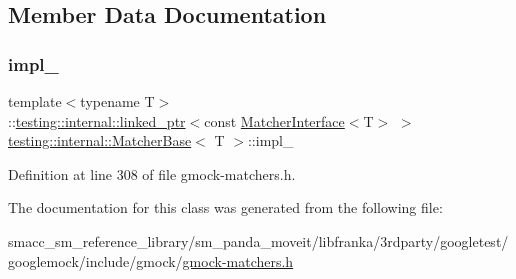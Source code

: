 \subsection{Member Data Documentation}
\mbox{\label{classtesting_1_1internal_1_1MatcherBase_ab4bf73686e35b5f033e7db82498644aa}} 
\subsubsection{\texorpdfstring{impl\+\_\+}{impl\_}}
{\footnotesize\ttfamily template$<$typename T$>$ \\
\+::\hyperlink{classtesting_1_1internal_1_1linked__ptr}{testing\+::internal\+::linked\+\_\+ptr}$<$const \hyperlink{classtesting_1_1MatcherInterface}{Matcher\+Interface}$<$T$>$ $>$ \hyperlink{classtesting_1_1internal_1_1MatcherBase}{testing\+::internal\+::\+Matcher\+Base}$<$ T $>$\+::impl\+\_\+\hspace{0.3cm}{\ttfamily [private]}}



Definition at line 308 of file gmock-\/matchers.\+h.



The documentation for this class was generated from the following file\+:\begin{DoxyCompactItemize}
\item 
smacc\+\_\+sm\+\_\+reference\+\_\+library/sm\+\_\+panda\+\_\+moveit/libfranka/3rdparty/googletest/googlemock/include/gmock/\hyperlink{gmock-matchers_8h}{gmock-\/matchers.\+h}\end{DoxyCompactItemize}
